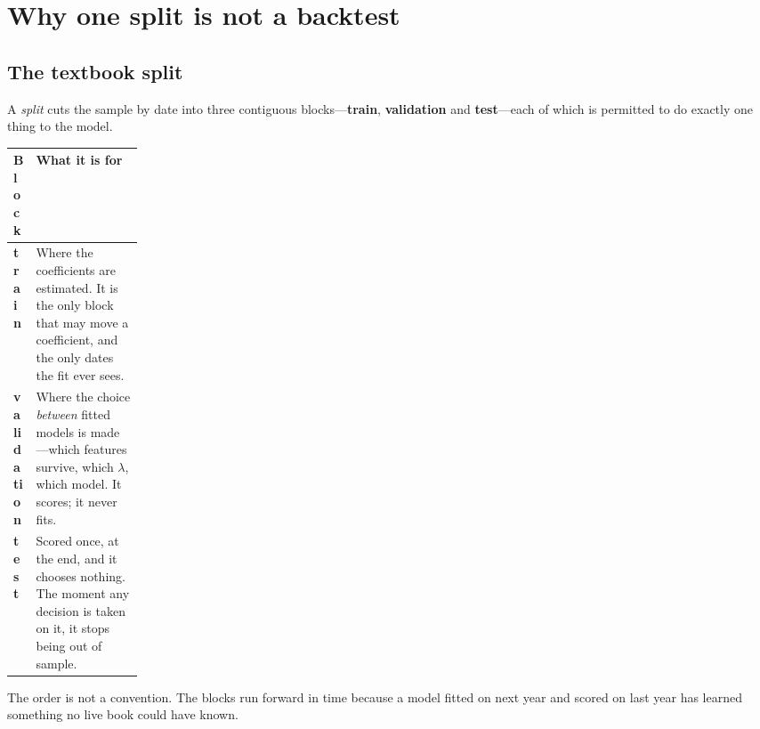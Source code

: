 


\section{Why one split is not a backtest}\label{sec:one-split}

\subsection{The textbook split}\label{sec:textbook-split}

\begin{definition}[Split]\label{def:split}
A \emph{split} cuts the sample by date into three contiguous blocks---\textbf{train},
\textbf{validation} and \textbf{test}---each of which is permitted to do exactly one thing to the
model.
\end{definition}

\begin{tabularx}{\linewidth}{|>{\raggedright\arraybackslash}p{0.17\linewidth}|X|}
\hline
\textbf{Block} & \textbf{What it is for} \\ \hline
\textbf{train}
  & Where the coefficients are estimated. It is the only block that may move a coefficient, and
    the only dates the fit ever sees. \\ \hline
\textbf{validation}
  & Where the choice \emph{between} fitted models is made---which features survive, which
    $\lambda$, which model. It scores; it never fits. \\ \hline
\textbf{test}
  & Scored once, at the end, and it chooses nothing. The moment any decision is taken on it, it
    stops being out of sample. \\ \hline
\end{tabularx}


The order is not a convention. The blocks run forward in time because a model fitted on next year
and scored on last year has learned something no live book could have known.

